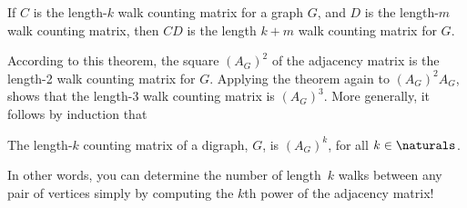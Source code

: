 \begin{theorem}\label{thm:CkDm}
 If $C$ is the length-$k$ walk counting matrix for a graph $G$, and
 $D$ is the length-$m$ walk counting matrix, then $CD$ is the length
 $k+m$ walk counting matrix for $G$.
\end{theorem}

According to this theorem, the square $(A_G)^2$ of the adjacency
matrix is the length-2 walk counting matrix for $G$.  Applying the
theorem again to $(A_G)^2A_G$, shows that the length-3 walk counting
matrix is $(A_G)^3$.  More generally, it follows by induction that
\begin{corollary}\label{AGklenk}
The length-$k$ counting matrix of a digraph, $G$, is $(A_G)^k$, for
all $k \in \naturals$.
\end{corollary}
In other words, you can determine the number of length~$k$ walks
between any pair of vertices simply by computing the $k$th power of
the adjacency matrix!   \iffalse

For example, the first three powers of the adjacency matrix for the
graph in Figure~\ref{fig:5AD} are:
\begin{align*}
    A &= \begin{pmatrix}
            0 & 1 & 1 & 1 \\
            1 & 0 & 1 & 0 \\
            1 & 1 & 0 & 1 \\
            1 & 0 & 1 & 0
         \end{pmatrix} & %
  A^2 &= \begin{pmatrix}
            3 & 1 & 2 & 1 \\
            1 & 2 & 1 & 2 \\
            2 & 1 & 3 & 1 \\
            1 & 2 & 1 & 2
         \end{pmatrix} & %
  A^3 &= \begin{pmatrix}
            4 & 5 & 5 & 5 \\
            5 & 2 & 5 & 2 \\
            5 & 5 & 4 & 5 \\
            5 & 2 & 5 & 2
         \end{pmatrix}
\end{align*}

Sure enough, $(A^3)_{14}$ is $5$, which is the number of length~3 walks
from~$v_1$ to~$v_4$.  And $(A^3)_{24} = 2$, which is the number of
length~3 walks from $v_2$ to~$v_4$.  
\fi


